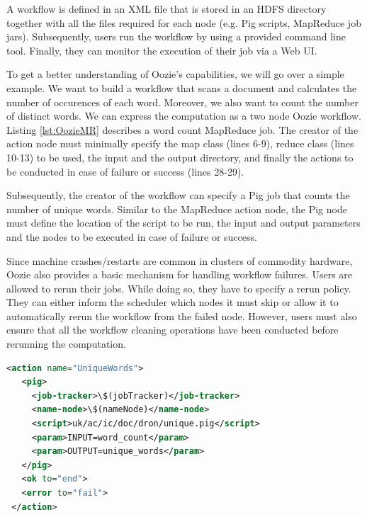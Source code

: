 \documentclass[11pt,a4paper,twoside]{report}
\begin{document}
A workflow is defined in an XML file that is stored in an HDFS directory together with all the files required for each node (e.g. Pig scripts, MapReduce job jars). Subsequently, users run the workflow by using a provided command line tool. Finally, they can monitor the execution of their job via a Web UI.


To get a better understanding of Oozie's capabilities, we will go over a simple example. We want to build a workflow that scans a document and calculates the number of occurences of each word. Moreover, we also want to count the number of distinct words. We can express the computation as a two node Oozie workflow. Listing \ref{lst:OozieMR} describes a word count MapReduce job. The creator of the action node must minimally specify the map class (lines 6-9), reduce class (lines 10-13) to be used, the input and the output directory, and finally the actions to be conducted in case of failure or success (lines 28-29).


Subsequently, the creator of the workflow can specify a Pig job that counts the number of unique words. Similar to the MapReduce action node, the Pig node must define the location of the script to be run, the input and output parameters and the nodes to be executed in case of failure or success.


Since machine crashes/restarts are common in clusters of commodity hardware, Oozie also provides a basic mechanism for handling workflow failures. Users are allowed to rerun their jobs. While doing so, they have to specify a rerun policy. They can either inform the scheduler which nodes it must skip or allow it to automatically rerun the workflow from the failed node. However, users must also ensure that all the workflow cleaning operations have been conducted before rerunning the computation.\\

\begin{lstlisting}[caption={Example of an Oozie Pig Job},
label={lst:OozieMR}, language=XML]
 <action name="UniqueWords">
   <pig>
     <job-tracker>\$(jobTracker)</job-tracker>
     <name-node>\$(nameNode)</name-node>
     <script>uk/ac/ic/doc/dron/unique.pig</script>
     <param>INPUT=word_count</param>
     <param>OUTPUT=unique_words</param>
   </pig>
   <ok to="end">
   <error to="fail">
 </action>
\end{lstlisting}

\newpage
\end{document}
